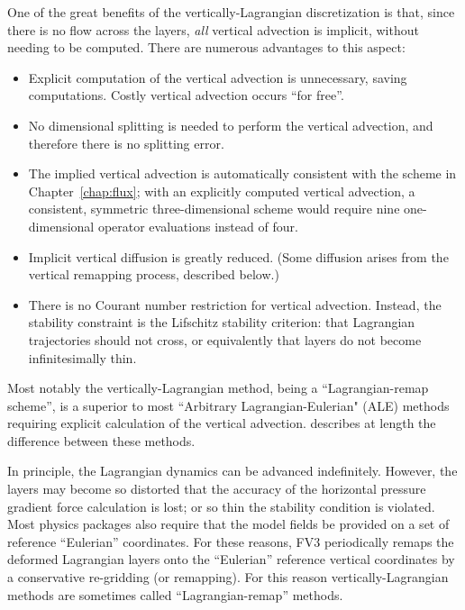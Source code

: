 \documentclass[10pt,letterpaper,margin=1in]{memoir}
\begin{document}
One of the great benefits of the vertically-Lagrangian discretization is that, since there is no flow across the layers, \textit{all} vertical advection is implicit, without needing to be computed. There are numerous advantages to this aspect:
\begin{itemize}
   \item Explicit computation of the vertical advection is unnecessary, saving computations. Costly vertical advection occurs ``for free''.
   \item No dimensional splitting is needed to perform the vertical advection, and therefore there is no splitting error.
   \item The implied vertical advection is automatically consistent with the scheme in Chapter~\ref{chap:flux}; with an explicitly computed vertical advection, a consistent, symmetric three-dimensional scheme would require nine one-dimensional operator evaluations instead of four.
   \item Implicit vertical diffusion is greatly reduced. (Some diffusion arises from the vertical remapping process, described below.)
   \item There is no Courant number restriction for vertical advection. Instead, the stability constraint is the Lifschitz stability criterion: that Lagrangian trajectories should not cross, or equivalently that layers do not become infinitesimally thin.
\end{itemize}
Most notably the vertically-Lagrangian method, being a ``Lagrangian-remap scheme'', is a superior to most ``Arbitrary Lagrangian-Eulerian" (ALE) methods requiring explicit calculation of the vertical advection. \citet{Griffies2020} describes at length the difference between these methods. 

In principle, the Lagrangian dynamics can be advanced indefinitely. However, the layers may become so distorted that the accuracy of the horizontal pressure gradient force calculation is lost; or so thin the stability condition is violated. Most physics packages also require that the model fields be provided on a set of reference ``Eulerian'' coordinates. For these reasons, FV3 periodically remaps the deformed Lagrangian layers onto the ``Eulerian'' reference vertical coordinates by a conservative re-gridding (or remapping). For this reason vertically-Lagrangian methods are sometimes called ``Lagrangian-remap'' methods.
\end{document}
